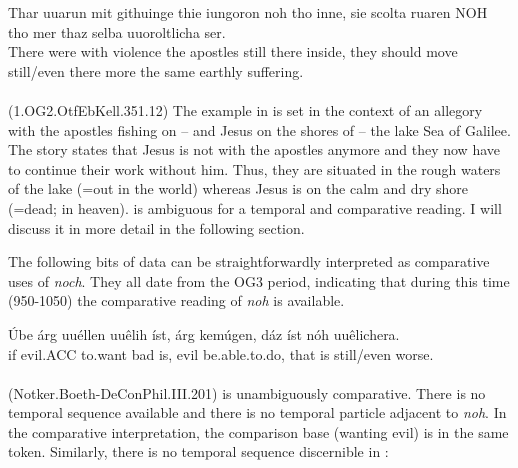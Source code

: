 \documentclass[output=paper,
modfonts
]{langscibook}
\begin{document}
\ea\gll Thar uuarun mit githuinge thie iungoron noh tho inne, sie scolta ruaren NOH tho mer thaz selba uuoroltlicha ser.\\
       There were with violence the apostles still there inside, they should move still/even there more the same earthly suffering.\\
\label{OG2_noch_mehr_ruehren_first} \\  (1.OG2.OtfEbKell.351.12)
\z
The example in  is set in the context of an allegory with the apostles fishing on -- and Jesus on the shores of -- the lake Sea of Galilee. The story states that Jesus is not with the apostles anymore and they now have to continue their work without him. Thus, they are situated in the rough waters of the lake (=out in the world) whereas Jesus is on the calm and dry shore (=dead; in heaven).  is ambiguous for a temporal and comparative reading. I will discuss it in more detail in the following section.

The following bits of data can be straightforwardly interpreted as comparative uses of \textit{noch}. They all date from the OG3 period, indicating that during this time (950-1050) the comparative reading of \textit{noh} is available.

\ea\gll Úbe árg uuéllen uuêlih íst, árg kemúgen, dáz íst nóh uuêlichera.\\
       if evil.ACC to.want bad is, evil be.able.to.do, that is still/even worse.\\%
\label{OG3_noch_schlimmer} \\  (Notker.Boeth-DeConPhil.III.201)
\z
{} is unambiguously comparative. There is no temporal sequence available and there is no temporal particle adjacent to \textit{noh}. In the comparative interpretation, the comparison base (wanting evil) is in the same token. Similarly, there is no temporal sequence discernible in :
\end{document}
